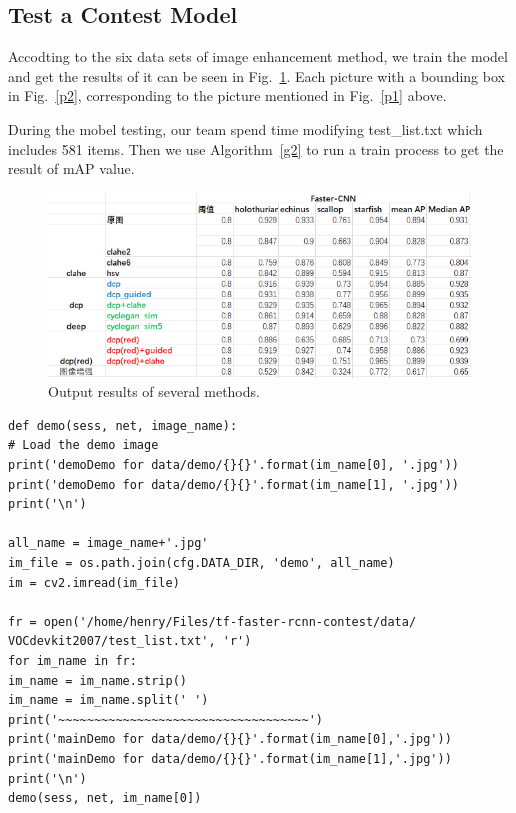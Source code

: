 \documentclass[a4paper]{article}
\begin{document}
\subsection{Test a Contest Model}

Accodting to the six data sets of image enhancement method, we train the model and get the results of it can be seen in Fig.~\ref{p3}. Each picture with a bounding box in Fig.~\ref{p2}, corresponding to the picture mentioned in Fig.~\ref{p1} above.

During the mobel testing, our team spend time modifying test\_list.txt which includes 581 items. Then we use Algorithm~\ref{g2} to run a train process to get the result of mAP value.

\begin{figure}
	\begin{center}
		\includegraphics[scale=0.6]{figures/7.png}
	\end{center}
	\caption{Output results of several methods.}
	\label{p3}
\end{figure}

\lstset{language=python}
\begin{lstlisting}
def demo(sess, net, image_name):
# Load the demo image
print('demoDemo for data/demo/{}{}'.format(im_name[0], '.jpg'))
print('demoDemo for data/demo/{}{}'.format(im_name[1], '.jpg'))
print('\n')

all_name = image_name+'.jpg'
im_file = os.path.join(cfg.DATA_DIR, 'demo', all_name)
im = cv2.imread(im_file)

fr = open('/home/henry/Files/tf-faster-rcnn-contest/data/
VOCdevkit2007/test_list.txt', 'r')
for im_name in fr:
im_name = im_name.strip()
im_name = im_name.split(' ')
print('~~~~~~~~~~~~~~~~~~~~~~~~~~~~~~~~~~~')
print('mainDemo for data/demo/{}{}'.format(im_name[0],'.jpg'))
print('mainDemo for data/demo/{}{}'.format(im_name[1],'.jpg'))
print('\n')
demo(sess, net, im_name[0])
\end{lstlisting}\label{g2}
\end{document}
